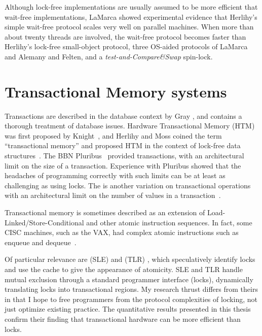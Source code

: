 Although lock-free implementations are usually assumed to be more
efficient that wait-free implementations, LaMarca \cite{LaMarca94}
showed experimental evidence that Herlihy's simple
wait-free protocol scales very well on parallel machines.
When more than about twenty threads are involved, the wait-free
protocol becomes
faster than Herlihy's lock-free small-object protocol, three OS-aided
protocols of LaMarca and Alemany and Felten, and a
\emph{test-and-Compare\&Swap} spin-lock.


\section{Transactional Memory systems}\label{sec:tm}

Transactions are described in the database context by Gray
\cite{Gray81b}, and \cite{GrayRe93} contains a thorough treatment of
database issues.  Hardware Transactional Memory (HTM) was first
proposed by Knight~\cite{Knight86},
and Herlihy and Moss coined the term ``transactional memory'' and
proposed HTM in the context of lock-free data
structures~\cite{HerlihyMo92,HerlihyMo93}.  The BBN
Pluribus~\cite[Ch.~23]{SiewiorekBeNe82} provided transactions, with an
architectural limit on the size of a transaction.  Experience with
Pluribus showed that the headaches of programming correctly with such
limits can be at least as challenging as using locks.  The
 is another variation on transactional
operations with an architectural limit on the number of values in a
transaction~\cite{StoneStHe93}.

Transactional memory is sometimes described as an extension of
Load-Linked/Store-Conditional \cite{JensenHaBr87} and other atomic
instruction sequences.  In fact, some CISC machines, such as the VAX,
had complex atomic instructions such as enqueue and
dequeue~\cite{Digital96}.

Of particular relevance are  (SLE) \cite{RajwarGo01} and 
(TLR) \cite{RajwarGo02}, which speculatively identify locks and use
the cache to give the appearance of atomicity.  SLE and TLR handle
mutual exclusion through a standard programmer interface (locks),
dynamically translating locks into transactional regions.  My
research thrust differs from theirs in that I hope to free
programmers from the protocol complexities of locking, not just
optimize existing practice.  The quantitative results presented in
this thesis confirm their finding that transactional hardware can be
more efficient than locks.


